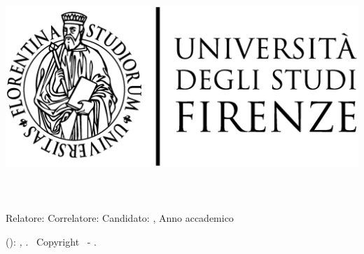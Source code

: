 \begin{titlepage}
	\begin{center}
   	\large
      \hfill
      \vfill
      \begingroup
			\spacedallcaps{\myUni} \\ 
			\myFaculty \\
			\myDegree \\ 
			\vspace{0.5cm}
         \includegraphics[width=.5\textwidth]{logo/logoUnifiName.eps}\\
         \vspace{0.5cm}    
      \endgroup 
      \vfill 
      \begingroup
      	\color{Maroon}\spacedallcaps{\myTitle} \\ \bigskip
      \endgroup
      \begingroup
      	\small\color{Maroon}\spacedallcaps{\mySubtitle} \\ \bigskip
      \endgroup
      \mySubsubtitle\\
      \vfill
      Relatore: {\itshape\myProf}\hfill Correlatore: {\itshape\mySupervisor}
      \vfill  
      Candidato: \spacedlowsmallcaps{\myName}
      \vfill
      \myMonth \myYear, Anno accademico {\itshape\myAcademicYear}
      \vfill                      
	\end{center}        
\end{titlepage}   
   \newpage
	\thispagestyle{empty}
	\hfill
	\vfill
	\noindent\myName(\texttt{\myMail}): 
	\textit{\myTitle,} 
	\myDegree. \textcopyright\ Copyright \myYear \myName\ - \mycopyright.
